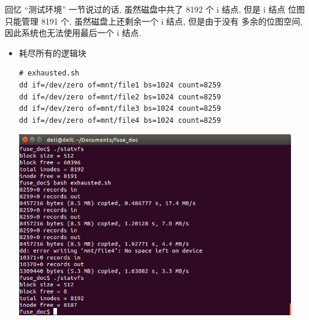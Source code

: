 \documentclass[nofonts]{ctexart}
\begin{document}
\begin{itemize}
回忆 ``测试环境'' 一节说过的话, 虽然磁盘中共了 8192 个 i 结点, 但是 i
结点 位图只能管理 8191 个, 虽然磁盘上还剩余一个 i 结点, 但是由于没有
多余的位图空间, 因此系统也无法使用最后一个 i 结点.

\begin{itemize}
\item
  耗尽所有的逻辑块

\begin{verbatim}
# exhausted.sh
dd if=/dev/zero of=mnt/file1 bs=1024 count=8259
dd if=/dev/zero of=mnt/file2 bs=1024 count=8259
dd if=/dev/zero of=mnt/file3 bs=1024 count=8259
dd if=/dev/zero of=mnt/file4 bs=1024 count=8259  
\end{verbatim}

  \includegraphics[width=12cm]{./images/./exhausted_2.png}
\end{itemize}
\end{itemize}
\end{document}
